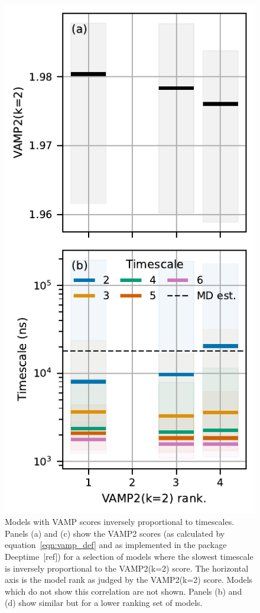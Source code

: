 \documentclass[journal=jacsat,manuscript=article]{achemso}
\begin{document}
\begin{figure}
    \centering
    \includegraphics{figures/bad_vamp_ranks.pdf}
    \caption{Models with VAMP scores inversely proportional to timescales. Panels (a) and (c) show the VAMP2 scores (as calculated by equation~\ref{eqn:vamp_def} and as implemented in the package Deeptime~[ref]) for a selection of models where the slowest timescale is inversely proportional to the VAMP2(k=2) score. The horizontal axis is the model rank as judged by the VAMP2(k=2) score. Models which do not show this correlation are not shown.  Panels (b) and (d) show similar but for a lower ranking set of models. }
    \label{fig:bad_vamp_scores}
\end{figure}
\end{document}
